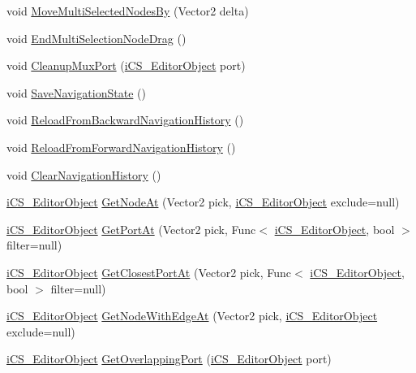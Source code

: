 \begin{DoxyCompactItemize}
\item 
void \hyperlink{classi_c_s___i_storage_afab9f05e069beb45512ccfdb61c3c6b5}{Move\+Multi\+Selected\+Nodes\+By} (Vector2 delta)
\item 
void \hyperlink{classi_c_s___i_storage_a9ac05dc74b22e526e7bb27bf310316e6}{End\+Multi\+Selection\+Node\+Drag} ()
\item 
void \hyperlink{classi_c_s___i_storage_a5dea4b900bf84dccf1767a7bb20a598d}{Cleanup\+Mux\+Port} (\hyperlink{classi_c_s___editor_object}{i\+C\+S\+\_\+\+Editor\+Object} port)
\item 
void \hyperlink{classi_c_s___i_storage_a22dd9982b7116c1e76fe6204737829cd}{Save\+Navigation\+State} ()
\item 
void \hyperlink{classi_c_s___i_storage_a32af5f1621612c0ae5ae0d6b53d63278}{Reload\+From\+Backward\+Navigation\+History} ()
\item 
void \hyperlink{classi_c_s___i_storage_a69a71b4f37820b67370b64b8bf55e469}{Reload\+From\+Forward\+Navigation\+History} ()
\item 
void \hyperlink{classi_c_s___i_storage_a3783eab54e5950bc6371f37d8492b48f}{Clear\+Navigation\+History} ()
\item 
\hyperlink{classi_c_s___editor_object}{i\+C\+S\+\_\+\+Editor\+Object} \hyperlink{classi_c_s___i_storage_a99619678d9e1f8bdde37545c893ae853}{Get\+Node\+At} (Vector2 pick, \hyperlink{classi_c_s___editor_object}{i\+C\+S\+\_\+\+Editor\+Object} exclude=null)
\item 
\hyperlink{classi_c_s___editor_object}{i\+C\+S\+\_\+\+Editor\+Object} \hyperlink{classi_c_s___i_storage_acf54c1b534a100d8ee0bbec484ec73d7}{Get\+Port\+At} (Vector2 pick, Func$<$ \hyperlink{classi_c_s___editor_object}{i\+C\+S\+\_\+\+Editor\+Object}, bool $>$ filter=null)
\item 
\hyperlink{classi_c_s___editor_object}{i\+C\+S\+\_\+\+Editor\+Object} \hyperlink{classi_c_s___i_storage_a04416f97c95d8394240514def8e9cb56}{Get\+Closest\+Port\+At} (Vector2 pick, Func$<$ \hyperlink{classi_c_s___editor_object}{i\+C\+S\+\_\+\+Editor\+Object}, bool $>$ filter=null)
\item 
\hyperlink{classi_c_s___editor_object}{i\+C\+S\+\_\+\+Editor\+Object} \hyperlink{classi_c_s___i_storage_ae637ea872f28aba13780b7d619463759}{Get\+Node\+With\+Edge\+At} (Vector2 pick, \hyperlink{classi_c_s___editor_object}{i\+C\+S\+\_\+\+Editor\+Object} exclude=null)
\item 
\hyperlink{classi_c_s___editor_object}{i\+C\+S\+\_\+\+Editor\+Object} \hyperlink{classi_c_s___i_storage_a75634aa484cddf875aeb0c902cc8a037}{Get\+Overlapping\+Port} (\hyperlink{classi_c_s___editor_object}{i\+C\+S\+\_\+\+Editor\+Object} port)

\end{DoxyCompactItemize}
